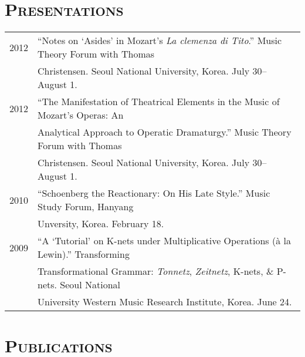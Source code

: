 \documentclass[a4,11pt,draft]{article}
\begin{document}
  \vspace{2.5mm}
  
  \section*{\textsc{Presentations}}
  
  \hspace*{-0.25cm}
  \begin{tabular}{p{2.5cm} p{12.5cm}}
  2012 & “Notes on ‘Asides’ in Mozart’s \textit{La clemenza di Tito}.” Music Theory Forum with Thomas\\
  & Christensen. Seoul National University, Korea. July 30–August 1.\\[2mm]

  2012 & “The Manifestation of Theatrical Elements in the Music of Mozart’s Operas: An\\
  & Analytical Approach to Operatic Dramaturgy.” Music Theory Forum with Thomas\\
  & Christensen. Seoul National University, Korea. July 30–August 1.\\[2mm]

  2010 & “Schoenberg the Reactionary: On His Late Style.” Music Study Forum, Hanyang\\
  & Unversity, Korea. February 18.\\[2mm]

  2009 & “A ‘Tutorial’ on K-nets under Multiplicative Operations (à la Lewin).” Transforming\\
  & Transformational Grammar: \textit{Tonnetz}, \textit{Zeitnetz}, K-nets, \& P-nets. Seoul National\\
  & University Western Music Research Institute, Korea. June 24.

  \end{tabular}
  
  \vspace{2.5mm}
  
  \section*{\textsc{Publications}}
  
\end{document}
